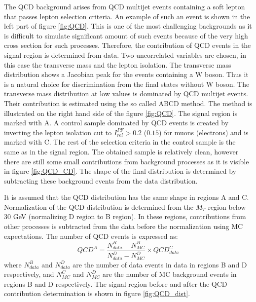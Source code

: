 The QCD background arises from QCD multijet events containing a soft lepton that passes lepton selection criteria. An example of such an event is shown in the left part of figure \ref{fig:QCD}. This is one of the most challenging backgrounds as it is difficult to simulate significant amount of such events because of the very high cross section for such processes. Therefore, the contribution of QCD events in the signal region is determined from data. Two uncorrelated variables are chosen, in this case the transverse mass and the lepton isolation. The transverse mass distribution shows a Jacobian peak for the events containing a W boson. Thus it is a natural choice for discrimination from the final states without W boson. The transverse mass distribution at low values is dominated by QCD multijet events. Their contribution is estimated using the so called ABCD method. The method is illustrated on the right hand side of the figure \ref{fig:QCD}. The signal region is marked with A. A control sample dominated by QCD events is created by inverting the lepton isolation cut to $I_{rel}^{PF}>0.2$ ($0.15$) for muons (electrons) and is marked with C. The rest of the selection criteria in the control sample is the same as in the signal region. The obtained sample is relatively clean, however there are still some small contributions from background processes as it is visible in figure \ref{fig:QCD_CD}. The shape of the final distribution is determined by subtracting these background events from the data distribution. 
\par It is assumed that the QCD distribution has the same shape in regions A and C. Normalization of the QCD distribution is determined from the $M_T$ region below 30 GeV (normalizing D region to B region). In these regions, contributions from other processes is subtracted from the data before the normalization using MC expectations. The number of QCD events is expressed as:
\begin{equation}
QCD^A=\frac{N^B_{data}-N^B_{MC}}{N^D_{data}-N^D_{MC}}\times QCD^{C}_{data}
\end{equation}       
where $N^B_{data}$ and $N^D_{data}$ are the number of data events in data in regions B and D respectively, and $N^C_{MC}$ and $N^D_{MC}$ are the number of MC background events in regions B and D respectively. The signal region before and after the QCD contribution determination is shown in figure \ref{fig:QCD_dist}.
